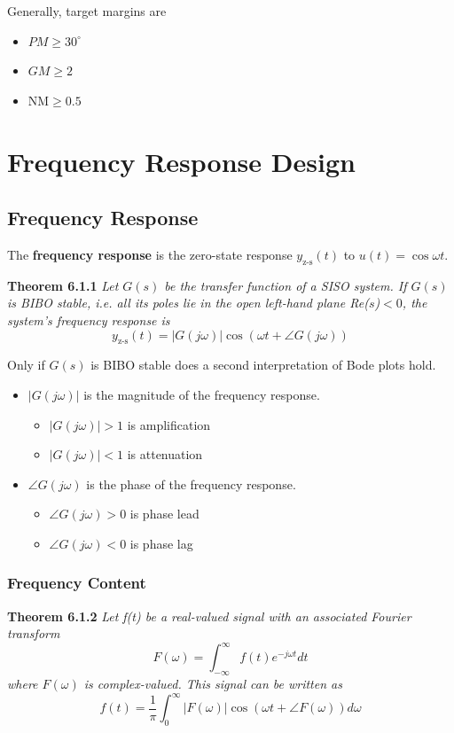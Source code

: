 \documentclass[letterpaper,12pt]{article}
\begin{document}
Generally, target margins are 
\begin{itemize}
    \item $PM \geq 30^{\circ}$
    \item $GM \geq 2$
    \item $\text{NM} \geq 0.5$
\end{itemize} 

\section{Frequency Response Design}
\subsection{Frequency Response}
The \textbf{frequency response} is the zero-state response $y_{\text{z-s}}(t)$ to $u(t) = \cos\omega t$.

\textbf{Theorem 6.1.1} \textit{Let $G(s)$ be the transfer function of a SISO system. If $G(s)$ is BIBO stable,
i.e. all its poles lie in the open left-hand plane Re($s$)$<0$, the system's frequency response is}
\begin{equation*}
    y_{\text{z-s}}(t) = |G(j\omega)|\cos(\omega t + \angle G(j\omega))
\end{equation*}

Only if $G(s)$ is BIBO stable does a second interpretation of Bode plots hold.
\begin{itemize}
    \item $|G(j\omega)|$ is the magnitude of the frequency response.
    \begin{itemize}
        \item $|G(j\omega)|>1$ is amplification
        \item $|G(j\omega)|<1$ is attenuation
    \end{itemize}
    \item $\angle G(j\omega)$ is the phase of the frequency response.
    \begin{itemize}
        \item $\angle G(j\omega) > 0$ is phase lead
        \item $\angle G(j\omega) < 0$ is phase lag
    \end{itemize}
\end{itemize}

\subsubsection{Frequency Content}
\textbf{Theorem 6.1.2} \textit{Let f(t) be a real-valued signal with an associated Fourier transform}
\begin{equation*}
    F(\omega) = \int_{-\infty}^{\infty} f(t) e^{-j\omega t} dt
\end{equation*}
\textit{where $F(\omega)$ is complex-valued. This signal can be written as}
\begin{equation*}
    f(t) = \frac{1}{\pi} \int_{0}^{\infty} |F(\omega)| \cos(\omega t + \angle F(\omega)) d\omega
\end{equation*}
\end{document}
